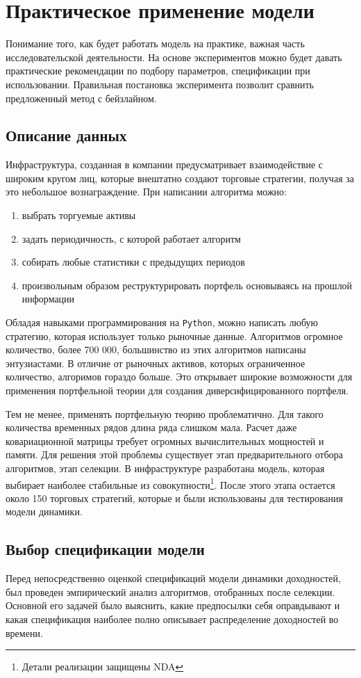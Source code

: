 \chapter{Практическое применение модели}
Понимание того, как будет работать модель на практике, важная часть исследовательской деятельности. На основе экспериментов можно будет давать практические рекомендации по подбору параметров, спецификации при использовании. Правильная постановка эксперимента позволит сравнить предложенный метод с бейзлайном.

\section{Описание данных}
Инфраструктура, созданная в компании предусматривает взаимодействие с широким кругом лиц, которые внештатно создают торговые стратегии, получая за это небольшое вознаграждение. При написании алгоритма можно:
\begin{enumerate}
	\item выбрать торгуемые активы
	\item задать периодичность, с которой работает алгоритм
	\item собирать любые статистики с предыдущих периодов
	\item произвольным образом реструктурировать портфель основываясь на прошлой информации
\end{enumerate}
Обладая навыками программирования на \texttt{Python}, можно написать любую стратегию, которая использует только рыночные данные. Алгоритмов огромное количество, более 700 000, большинство из этих алгоритмов написаны энтузиастами. В отличие от рыночных активов, которых ограниченное количество, алгоримов гораздо больше. Это открывает широкие возможности для применения портфельной теории для создания диверсифицированного портфеля.

Тем не менее, применять портфельную теорию проблематично. Для такого количества временных рядов длина ряда слишком мала. Расчет даже ковариационной матрицы требует огромных вычислительных мощностей и памяти. Для решения этой проблемы существует этап предварительного отбора алгоритмов, этап селекции. В инфраструктуре разработана модель, которая выбирает наиболее стабильные из совокупности\footnote{Детали реализации защищены NDA}. После этого этапа остается около 150 торговых стратегий, которые и были использованы для тестирования модели динамики.

\section{Выбор спецификации модели}
Перед непосредственно оценкой спецификаций модели динамики доходностей, был проведен эмпирический анализ алгоритмов, отобранных после селекции. Основной его задачей было выяснить, какие предпосылки себя оправдывают и какая спецификация наиболее полно описывает распределение доходностей во времени. 

